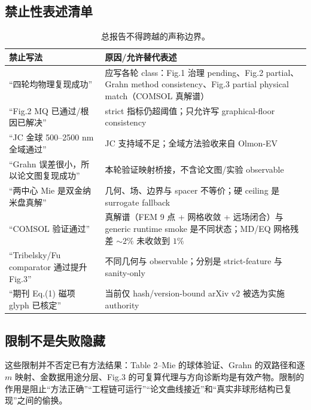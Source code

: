 \subsection{禁止性表述清单}

\begin{table}[H]
\centering
\small
\begin{tabularx}{\textwidth}{p{4.5cm}X}
\toprule
禁止写法 & 原因/允许替代表述 \\
\midrule
“四轮均物理复现成功” & 应写各轮 class：Fig.1 治理 pending、Fig.2 partial、Grahn method consistency、Fig.3 partial physical match（COMSOL 真解谱）\\
“Fig.2 MQ 已通过/根因已解决” & strict 指标仍超阈值；只允许写 graphical-floor consistency \\
“JC 金球 500--2500 nm 全域通过” & JC 支持域不足；全域方法验收来自 Olmon-EV \\
“Grahn 误差很小，所以论文图复现成功” & 本轮验证映射桥接，不含论文图/实验 observable \\
“两中心 Mie 是双金纳米盘真解” & 几何、场、边界与 spacer 不等价；硬 ceiling 是 surrogate fallback \\
“COMSOL 验证通过” & 真解谱（FEM 9 点 + 网格收敛 + 远场闭合）与 generic runtime smoke 是不同状态；MD/EQ 网格残差 $\sim2\%$ 未收敛到 $1\%$ \\
“Tribelsky/Fu comparator 通过提升 Fig.3” & 不同几何与 observable；分别是 strict-feature 与 sanity-only \\
“期刊 Eq.(1) 磁项 glyph 已核定” & 当前仅 hash/version-bound arXiv v2 被选为实施 authority \\
\bottomrule
\end{tabularx}
\caption{总报告不得跨越的声称边界。}
\end{table}

\subsection{限制不是失败隐藏}

这些限制并不否定已有方法结果：Table 2--Mie 的球体验证、Grahn 的双路径和逐 $m$ 映射、金数据用途分层、Fig.3 的可复算代理与方向诊断均是有效产物。限制的作用是阻止“方法正确”“工程链可运行”“论文曲线接近”和“真实非球形结构已复现”之间的偷换。
